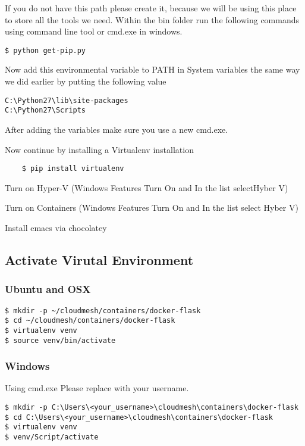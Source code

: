 If you do not have this path please create it, because we will be using
this place to store all the tools we need. Within the bin folder run the
following commands using command line tool or cmd.exe in windows.

\begin{lstlisting}
$ python get-pip.py
\end{lstlisting}

Now add this environmental variable to PATH in System variables the same
way we did earlier by putting the following value

\begin{lstlisting}
C:\Python27\lib\site-packages
C:\Python27\Scripts
\end{lstlisting}

After adding the variables make sure you use a new cmd.exe.

Now continue by installing a Virtualenv installation

\begin{lstlisting}
    $ pip install virtualenv 
\end{lstlisting}

Turn on Hyper-V (Windows Features Turn On and In the list selectHyber V)

Turn on Containers (Windows Features Turn On and In the list select
Hyber V)

Install emacs via chocolatey

\subsection{Activate Virutal Environment}

\subsubsection{Ubuntu and OSX}

\begin{lstlisting}
$ mkdir -p ~/cloudmesh/containers/docker-flask
$ cd ~/cloudmesh/containers/docker-flask
$ virtualenv venv
$ source venv/bin/activate
\end{lstlisting}

\subsubsection{Windows}

Using cmd.exe Please replace with your username.

\begin{lstlisting}
$ mkdir -p C:\Users\<your_username>\cloudmesh\containers\docker-flask
$ cd C:\Users\<your_username>\cloudmesh\containers\docker-flask
$ virtualenv venv
$ venv/Script/activate
\end{lstlisting}

